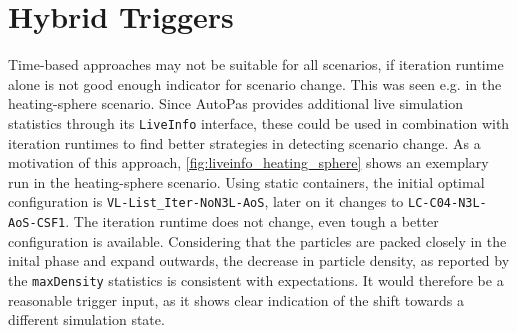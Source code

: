 


\section{Hybrid Triggers}
\label{sec:liveinfo_benchmarks}

Time-based approaches may not be suitable for all scenarios, if iteration runtime alone is not good enough indicator for scenario change. This was seen e.g. in the heating-sphere scenario. Since AutoPas provides additional live simulation statistics through its \texttt{LiveInfo} interface, these could be used in combination with iteration runtimes to find better strategies in detecting scenario change.
As a motivation of this approach, \autoref{fig:liveinfo_heating_sphere} shows an exemplary run in the heating-sphere scenario.
Using static containers, the initial optimal configuration is \texttt{VL-List\_Iter-NoN3L-AoS}, later on it changes to \texttt{LC-C04-N3L-AoS-CSF1}. \cite{Newcome2025}
The iteration runtime does not change, even tough a better configuration is available. Considering that the particles are packed closely in the inital phase and expand outwards, the decrease in particle density, as reported by the \texttt{maxDensity} statistics is consistent with expectations. It would therefore be a reasonable trigger input, as it shows clear indication of the shift towards a different simulation state.

